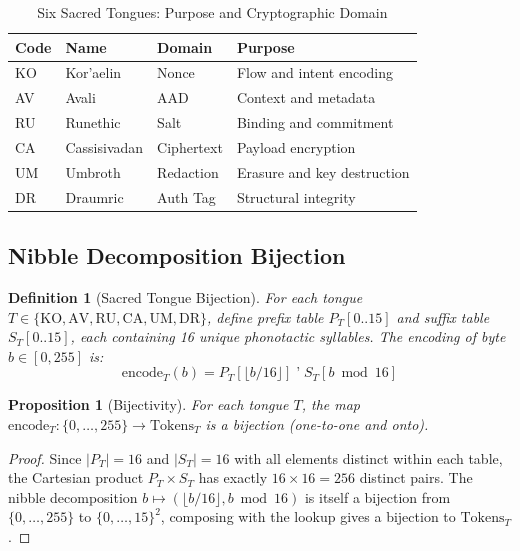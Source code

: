 \documentclass[11pt,a4paper]{article}
\newtheorem{proposition}[theorem]{Proposition}
\newtheorem{definition}[theorem]{Definition}
\begin{document}
\begin{table}[h]
\centering
\caption{Six Sacred Tongues: Purpose and Cryptographic Domain}
\label{tab:tongues}
\begin{tabular}{@{}lllp{5cm}@{}}
\toprule
\textbf{Code} & \textbf{Name} & \textbf{Domain} & \textbf{Purpose} \\
\midrule
KO & Kor'aelin  & Nonce     & Flow and intent encoding \\
AV & Avali      & AAD       & Context and metadata \\
RU & Runethic   & Salt      & Binding and commitment \\
CA & Cassisivadan & Ciphertext & Payload encryption \\
UM & Umbroth    & Redaction & Erasure and key destruction \\
DR & Draumric   & Auth Tag  & Structural integrity \\
\bottomrule
\end{tabular}
\end{table}

\subsection{Nibble Decomposition Bijection}

\begin{definition}[Sacred Tongue Bijection]
For each tongue $T \in \{\text{KO}, \text{AV}, \text{RU}, \text{CA},
\text{UM}, \text{DR}\}$, define prefix table $P_T[0..15]$ and suffix
table $S_T[0..15]$, each containing 16 unique phonotactic syllables.
The encoding of byte $b \in [0, 255]$ is:
\begin{equation}
  \text{encode}_T(b) = P_T\!\left[\lfloor b/16 \rfloor\right]
  \;\texttt{'}\; S_T\!\left[b \bmod 16\right]
\end{equation}
\end{definition}

\begin{proposition}[Bijectivity]
For each tongue $T$, the map $\text{encode}_T : \{0, \ldots, 255\}
\to \text{Tokens}_T$ is a bijection (one-to-one and onto).
\end{proposition}

\begin{proof}
Since $|P_T| = 16$ and $|S_T| = 16$ with all elements distinct within
each table, the Cartesian product $P_T \times S_T$ has exactly
$16 \times 16 = 256$ distinct pairs. The nibble decomposition
$b \mapsto (\lfloor b/16 \rfloor, b \bmod 16)$ is itself a bijection
from $\{0, \ldots, 255\}$ to $\{0, \ldots, 15\}^2$, composing with
the lookup gives a bijection to $\text{Tokens}_T$.
\end{proof}
\end{document}
